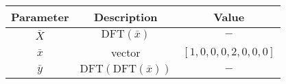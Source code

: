 \begin{tabular}{|c|c|c|}
	\hline
	\textbf{Parameter} &  \textbf{Description} & \textbf{Value}\\[6pt]
	\hline
	$\bar{X}$ & $\text{DFT}(\bar{x})$ & $-$ \\[6pt]
	\hline
	$\bar{x}$ & vector & $[1,0,0,0,2,0,0,0]$ \\[6pt]
	\hline
	$\bar{y}$ & $\text{DFT}(\text{DFT}(\bar{x}))$ & $-$ \\[6pt]
	\hline 
\end{tabular}
